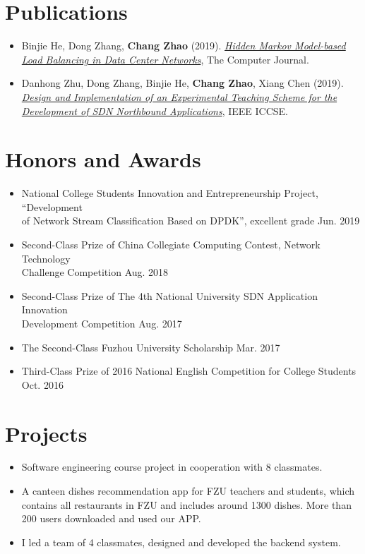 \documentclass{resume}
\begin{document}
\section{Publications}
\begin{itemize}
  \item Binjie He, Dong Zhang, \textbf{Chang Zhao} (2019). \href{https://academic.oup.com/comjnl/advance-article-abstract/doi/10.1093/comjnl/bxz142/5666159}{\textit{Hidden Markov Model-based Load Balancing in Data Center Networks}}, The
  Computer Journal.
  \item Danhong Zhu, Dong Zhang, Binjie He, \textbf{Chang Zhao}, Xiang Chen (2019). \href{https://ieeexplore.ieee.org/document/8845443}{\textit{Design and Implementation of an Experimental Teaching Scheme for the Development of SDN Northbound Applications}}, IEEE ICCSE.
\end{itemize}

\section{Honors and Awards}
\begin{itemize}
  \item National College Students Innovation and Entrepreneurship Project, ``Development \\of Network Stream Classification Based on DPDK'', excellent grade \hfill Jun. 2019
  \item Second-Class Prize of China Collegiate Computing Contest, Network Technology \\Challenge Competition \hfill Aug. 2018 
  \item Second-Class Prize of The 4th National University SDN Application Innovation \\Development Competition \hfill Aug. 2017
  \item The Second-Class Fuzhou University Scholarship \hfill Mar. 2017
  \item Third-Class Prize of 2016 National English Competition for College Students \hfill Oct. 2016
\end{itemize}

\section{Projects}
\begin{itemize}
  \item Software engineering course project in cooperation with 8 classmates.
  \item A canteen dishes recommendation app for FZU teachers and students, which contains all restaurants in FZU and includes around 1300 dishes. More than 200 users downloaded and used our APP.
  \item I led a team of 4 classmates, designed and developed the backend system.
\end{itemize}
\end{document}
